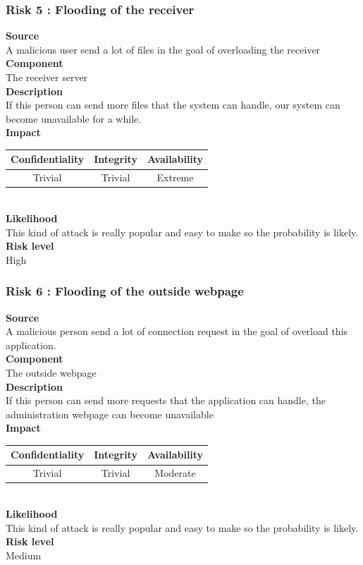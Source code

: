\documentclass[a4paper,11pt]{article}
\begin{document}
\subsubsection{Risk 5 : Flooding of the receiver }
\textbf{Source} \\A malicious user send a lot of files in the goal of overloading the receiver\\
\textbf{Component} \\The receiver server\\
\textbf{Description}\\ If this person can send more files that the system can handle, our system can become unavailable for a while. \\
\textbf{Impact}\\
\begin{tabular}{|c|c|c|}
\hline
Confidentiality & Integrity & Availability \\
\hline
Trivial & Trivial & Extreme \\
\hline
\end{tabular}\\
\textbf{Likelihood}\\ This kind of attack is really popular and easy to make so the probability is likely.\\
\textbf{Risk level}\\High\\

\subsubsection{Risk 6 : Flooding of the outside webpage}
\textbf{Source} \\A malicious person send a lot of connection request in the goal of overload this application. \\
\textbf{Component} \\The outside webpage\\
\textbf{Description}\\ If this person can send more requests that the application can handle, the administration webpage can become unavailable \\
\textbf{Impact}\\
\begin{tabular}{|c|c|c|}
\hline
Confidentiality & Integrity & Availability \\
\hline
Trivial & Trivial & Moderate \\
\hline
\end{tabular}\\
\textbf{Likelihood}\\ This kind of attack is really popular and easy to make so the probability is likely.\\
\textbf{Risk level}\\Medium\\
\end{document}
